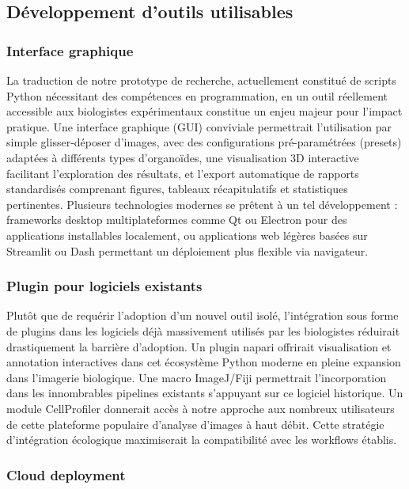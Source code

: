 \subsection{Développement d'outils utilisables}

\subsubsection{Interface graphique}

La traduction de notre prototype de recherche, actuellement constitué de scripts Python nécessitant des compétences en programmation, en un outil réellement accessible aux biologistes expérimentaux constitue un enjeu majeur pour l'impact pratique. Une interface graphique (GUI) conviviale permettrait l'utilisation par simple glisser-déposer d'images, avec des configurations pré-paramétrées (presets) adaptées à différents types d'organoïdes, une visualisation 3D interactive facilitant l'exploration des résultats, et l'export automatique de rapports standardisés comprenant figures, tableaux récapitulatifs et statistiques pertinentes. Plusieurs technologies modernes se prêtent à un tel développement : frameworks desktop multiplateformes comme Qt ou Electron pour des applications installables localement, ou applications web légères basées sur Streamlit ou Dash permettant un déploiement plus flexible via navigateur.

\subsubsection{Plugin pour logiciels existants}

Plutôt que de requérir l'adoption d'un nouvel outil isolé, l'intégration sous forme de plugins dans les logiciels déjà massivement utilisés par les biologistes réduirait drastiquement la barrière d'adoption. Un plugin napari offrirait visualisation et annotation interactives dans cet écosystème Python moderne en pleine expansion dans l'imagerie biologique. Une macro ImageJ/Fiji permettrait l'incorporation dans les innombrables pipelines existants s'appuyant sur ce logiciel historique. Un module CellProfiler donnerait accès à notre approche aux nombreux utilisateurs de cette plateforme populaire d'analyse d'images à haut débit. Cette stratégie d'intégration écologique maximiserait la compatibilité avec les workflows établis.

\subsubsection{Cloud deployment}

